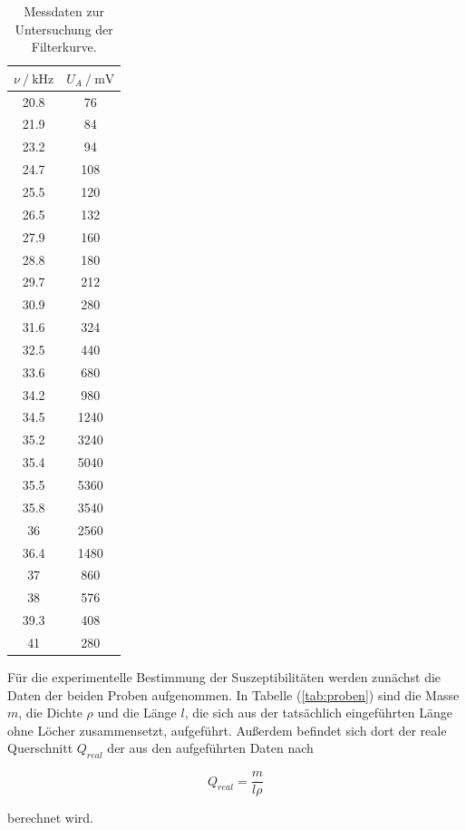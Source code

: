 \newpage
\begin{table}
\centering
\caption{Messdaten zur Untersuchung der Filterkurve.}
\begin{tabular}{c c}
\toprule
{$\nu \mathbin{/} \si{\kilo\hertz} $} & {$U_A \mathbin{/} \si{\milli\volt}$}  \\
\midrule
20.8  &    76 \\
21.9  &    84 \\
23.2  &    94 \\
24.7  &   108 \\
25.5  &   120 \\
26.5  &   132 \\
27.9  &   160 \\
28.8  &   180 \\
29.7  &   212 \\
30.9  &   280 \\
31.6  &   324 \\
32.5  &   440 \\
33.6  &   680 \\
34.2  &   980 \\
34.5  &  1240 \\
35.2  &  3240 \\
35.4  &  5040 \\
35.5  &  5360 \\
35.8  &  3540 \\
36    &  2560 \\
36.4  &  1480 \\
37    &   860 \\
38    &   576 \\
39.3  &   408 \\
41    &   280 \\
\bottomrule
\end{tabular}
\label{tab:selektiv}
\end{table}

\newpage
\noindent
Für die experimentelle Bestimmung der Suszeptibilitäten werden zunächst die Daten der beiden Proben aufgenommen.
In Tabelle (\ref{tab:proben}) sind die Masse $m$, die Dichte $\rho$ und die Länge $l$, 
die sich aus der tatsächlich eingeführten Länge ohne Löcher zusammensetzt, aufgeführt.
Außerdem befindet sich dort der reale Querschnitt $Q_{real}$ 
der aus den aufgeführten Daten nach 

\begin{equation}
Q_{real} = \frac{m}{l\rho}
\end{equation}

\noindent
berechnet wird.

